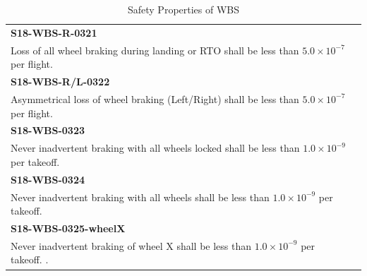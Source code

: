 \begin{center}
\begin{table}
\caption{Safety Properties of WBS}
\begin{tabular}{@{}ll}
\toprule
\textbf{S18-WBS-R-0321} \\Loss of all wheel braking during landing or RTO shall be less than $5.0 \times 10^{-7}$ per flight.                                    \\ \midrule 
\textbf{S18-WBS-R/L-0322}  \\ Asymmetrical loss of wheel braking (Left/Right) shall be less than $5.0 \times 10^{-7}$ per flight. \\ \midrule
\textbf{S18-WBS-0323} \\ Never inadvertent braking with all wheels locked shall be less than $1.0 \times 10^{-9}$ per takeoff.                                                                                                                                                                                                               \\ \midrule
\textbf{S18-WBS-0324}  \\ Never inadvertent braking with all wheels shall be less than $1.0 \times 10^{-9}$ per takeoff.                                                                                                            \\ \midrule
\textbf{S18-WBS-0325-wheelX} \\ Never inadvertent braking of wheel X shall be less than $1.0 \times 10^{-9}$ per takeoff.                                                                                                           .                                                                                                                 \\ \bottomrule
\end{tabular}
\vspace{0.4cm}
\label{tab:safetyProperties}
\end{table} 
\end{center} 

